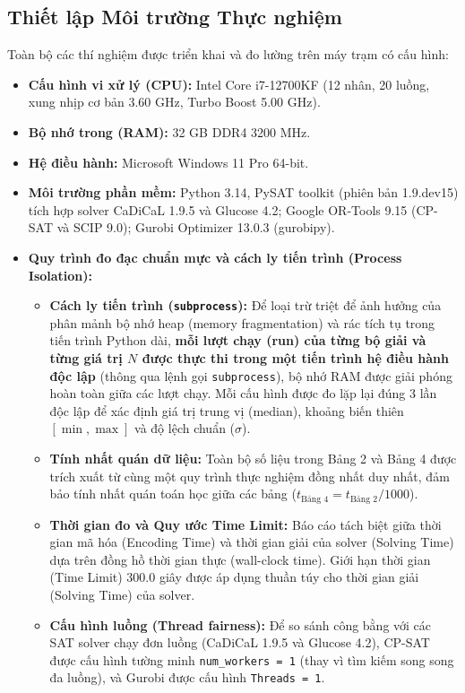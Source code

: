 \documentclass[11pt,a4paper]{article}
\begin{document}
\subsection{Thiết lập Môi trường Thực nghiệm}
Toàn bộ các thí nghiệm được triển khai và đo lường trên máy trạm có cấu hình:
\begin{itemize}
    \item \textbf{Cấu hình vi xử lý (CPU):} Intel Core i7-12700KF (12 nhân, 20 luồng, xung nhịp cơ bản 3.60 GHz, Turbo Boost 5.00 GHz).
    \item \textbf{Bộ nhớ trong (RAM):} 32 GB DDR4 3200 MHz.
    \item \textbf{Hệ điều hành:} Microsoft Windows 11 Pro 64-bit.
    \item \textbf{Môi trường phần mềm:} Python 3.14, PySAT toolkit (phiên bản 1.9.dev15) tích hợp solver CaDiCaL 1.9.5 và Glucose 4.2; Google OR-Tools 9.15 (CP-SAT và SCIP 9.0); Gurobi Optimizer 13.0.3 (gurobipy).
    \item \textbf{Quy trình đo đạc chuẩn mực và cách ly tiến trình (Process Isolation):}
      \begin{itemize}
          \item \textbf{Cách ly tiến trình (\texttt{subprocess}):} Để loại trừ triệt để ảnh hưởng của phân mảnh bộ nhớ heap (memory fragmentation) và rác tích tụ trong tiến trình Python dài, \textbf{mỗi lượt chạy (run) của từng bộ giải và từng giá trị $N$ được thực thi trong một tiến trình hệ điều hành độc lập} (thông qua lệnh gọi \texttt{subprocess}), bộ nhớ RAM được giải phóng hoàn toàn giữa các lượt chạy. Mỗi cấu hình được đo lặp lại đúng 3 lần độc lập để xác định giá trị trung vị (median), khoảng biến thiên $[\min, \max]$ và độ lệch chuẩn ($\sigma$).
          \item \textbf{Tính nhất quán dữ liệu:} Toàn bộ số liệu trong Bảng 2 và Bảng 4 được trích xuất từ cùng một quy trình thực nghiệm đồng nhất duy nhất, đảm bảo tính nhất quán toán học giữa các bảng ($t_{\text{Bảng 4}} = t_{\text{Bảng 2}} / 1000$).
          \item \textbf{Thời gian đo và Quy ước Time Limit:} Báo cáo tách biệt giữa thời gian mã hóa (Encoding Time) và thời gian giải của solver (Solving Time) dựa trên đồng hồ thời gian thực (wall-clock time). Giới hạn thời gian (Time Limit) 300.0 giây được áp dụng thuần túy cho thời gian giải (Solving Time) của solver.
          \item \textbf{Cấu hình luồng (Thread fairness):} Để so sánh công bằng với các SAT solver chạy đơn luồng (CaDiCaL 1.9.5 và Glucose 4.2), CP-SAT được cấu hình tường minh \texttt{num\_workers = 1} (thay vì tìm kiếm song song đa luồng), và Gurobi được cấu hình \texttt{Threads = 1}.

\end{itemize}
\end{itemize}
\end{document}
